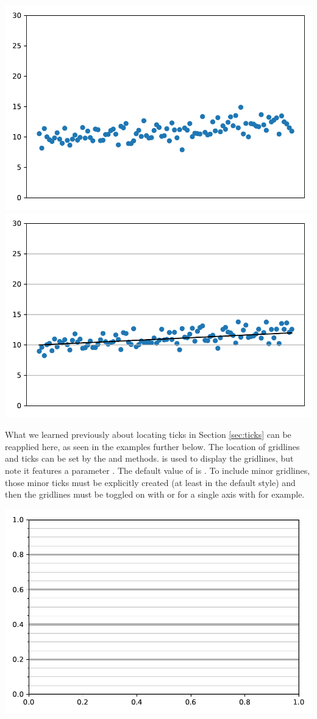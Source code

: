 \begin{center}
    \includegraphics[width = .48\textwidth]{figures/proseplots/y-grid-false.pdf}\includegraphics[width = .48\textwidth]{figures/proseplots/y-grid-true.pdf}
\end{center}



What we learned previously about locating ticks in Section \ref{sec:ticks} can be reapplied here, as seen in the examples further below. The location of gridlines and ticks can be set by the  and  methods.  is used to display the gridlines, but note it features a parameter . The default value of  is . To include minor gridlines, those minor ticks must be explicitly created (at least in the default style) and then the gridlines must be toggled on with  or for a single axis with  for example. 



\begin{center}
    \includegraphics[width = .8\textwidth]{figures/proseplots/grids-auto.pdf}
\end{center}

